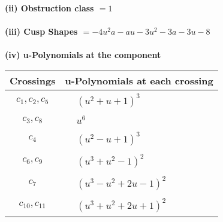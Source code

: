 \documentclass[1p]{elsarticle_modified}
\theoremstyle{definition}
\begin{document}
\flushleft \textbf{(ii) Obstruction class $= 1$}\\~\\
\flushleft \textbf{(iii) Cusp Shapes $= -4 u^2 a- a u-3 u^2-3 a-3 u-8$}\\~\\
\newpage\renewcommand{\arraystretch}{1}
\flushleft \textbf{(iv) u-Polynomials at the component}\newline \\
\begin{tabular}{m{50pt}|m{274pt}}
Crossings & \hspace{64pt}u-Polynomials at each crossing \\
\hline $$\begin{aligned}c_{1},c_{2},c_{5}\end{aligned}$$&$\begin{aligned}
&(u^2+u+1)^3
\end{aligned}$\\
\hline $$\begin{aligned}c_{3},c_{8}\end{aligned}$$&$\begin{aligned}
&u^6
\end{aligned}$\\
\hline $$\begin{aligned}c_{4}\end{aligned}$$&$\begin{aligned}
&(u^2- u+1)^3
\end{aligned}$\\
\hline $$\begin{aligned}c_{6},c_{9}\end{aligned}$$&$\begin{aligned}
&(u^3+u^2-1)^2
\end{aligned}$\\
\hline $$\begin{aligned}c_{7}\end{aligned}$$&$\begin{aligned}
&(u^3- u^2+2 u-1)^2
\end{aligned}$\\
\hline $$\begin{aligned}c_{10},c_{11}\end{aligned}$$&$\begin{aligned}
&(u^3+u^2+2 u+1)^2
\end{aligned}$\\
\hline
\end{tabular}\\~\\
\end{document}
